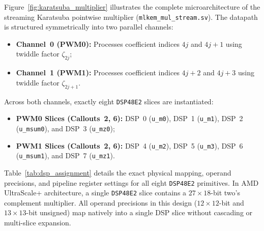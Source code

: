 Figure~\ref{fig:karatsuba_multiplier} illustrates the complete microarchitecture of the streaming Karatsuba pointwise multiplier (\texttt{mlkem\_mul\_stream.sv}). The datapath is structured symmetrically into two parallel channels:
\begin{itemize}
    \item \textbf{Channel~0 (PWM0):} Processes coefficient indices $4j$ and $4j+1$ using twiddle factor $\zeta_{2j}$;
    \item \textbf{Channel~1 (PWM1):} Processes coefficient indices $4j+2$ and $4j+3$ using twiddle factor $\zeta_{2j+1}$.
\end{itemize}

Across both channels, exactly eight \texttt{DSP48E2} slices are instantiated:
\begin{itemize}
    \item \textbf{PWM0 Slices (\textbf{Callouts~2, 6}):} DSP~0 (\texttt{u\_m0}), DSP~1 (\texttt{u\_m1}), DSP~2 (\texttt{u\_msum0}), and DSP~3 (\texttt{u\_mz0});
    \item \textbf{PWM1 Slices (\textbf{Callouts~2, 6}):} DSP~4 (\texttt{u\_m2}), DSP~5 (\texttt{u\_m3}), DSP~6 (\texttt{u\_msum1}), and DSP~7 (\texttt{u\_mz1}).
\end{itemize}

Table~\ref{tab:dsp_assignment} details the exact physical mapping, operand precisions, and pipeline register settings for all eight \texttt{DSP48E2} primitives. In AMD UltraScale+ architecture, a single \texttt{DSP48E2} slice contains a $27 \times 18$-bit two's complement multiplier. All operand precisions in this design ($12 \times 12$-bit and $13 \times 13$-bit unsigned) map natively into a single DSP slice without cascading or multi-slice expansion.


